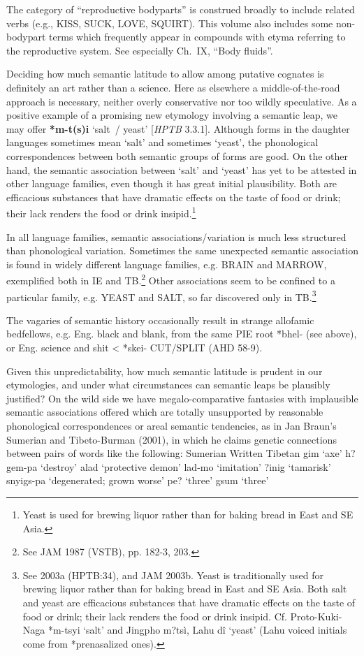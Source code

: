 The category of “reproductive bodyparts” is construed broadly to include
related verbs (e.g., KISS, SUCK, LOVE, SQUIRT). This volume also includes some
non-bodypart terms which frequently appear in compounds with etyma referring to
the reproductive system.  See especially Ch.~IX, “Body fluids”.


Deciding how much semantic latitude to allow among putative cognates is
definitely an art rather than a science. Here as elsewhere a middle-of-the-road
approach is necessary, neither overly conservative nor too wildly speculative.
As a positive example of a promising new etymology involving a semantic leap, we
may offer \textbf{*m-t(s)i} ‘salt~/ yeast’ [\textit{HPTB} 3.3.1].  Although forms in the daughter
languages sometimes mean ‘salt’ and sometimes ‘yeast’, the phonological
correspondences between both semantic groups of forms are good.  On the other
hand, the semantic association between ‘salt’ and ‘yeast’ has yet to be attested
in other language families, even though it has great initial plausibility. Both
are efficacious substances that have dramatic effects on the taste of food or
drink; their lack renders the food or drink insipid.\footnote{Yeast is used for
brewing liquor rather than for baking bread in East and SE Asia.}

In all language families, semantic associations/variation is much less structured than phonological variation. Sometimes the same unexpected semantic association is found in widely different language families, e.g. BRAIN and MARROW, exemplified both in IE and TB.\footnote{See JAM 1987 (VSTB), pp. 182-3, 203.} Other associations seem to be confined to a particular family, e.g. YEAST and SALT, so far discovered only in TB.\footnote{See 2003a (HPTB:34), and JAM 2003b. Yeast is traditionally used for brewing liquor rather than for baking bread in East and SE Asia. Both salt and yeast are efficacious substances that have dramatic effects on the taste of food or drink; their lack renders the food or drink insipid. Cf. Proto-Kuki-Naga *m-tsyi ‘salt’ and Jingpho m?tsì, Lahu dî ‘yeast’ (Lahu voiced initials come from *prenasalized ones).}

The vagaries of semantic history occasionally result in strange allofamic bedfellows, e.g. Eng. black and blank, from the same PIE root *bhel- (see above), or Eng. science and shit < *skei- CUT/SPLIT (AHD 58-9).

Given this unpredictability, how much semantic latitude is prudent in our etymologies, and under what circumstances can semantic leaps be plausibly justified? On the wild side we have megalo-comparative fantasies with implausible semantic associations offered which are totally unsupported by reasonable phonological correspondences or areal semantic tendencies, as in Jan Braun’s Sumerian and Tibeto-Burman (2001), in which he claims genetic connections between pairs of words like the following:
		Sumerian				Written Tibetan
		gim ‘axe’				h?gem-pa ‘destroy’
		alad ‘protective demon’		lad-mo ‘imitation’
		?inig ‘tamarisk’			snyigs-pa ‘degenerated; grown worse’
		pe? ‘three’			gsum ‘three’

